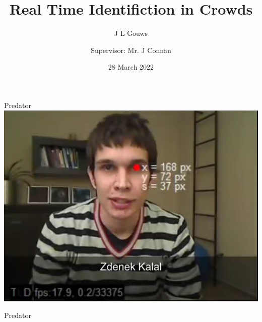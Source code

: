 \documentclass[mathserif]{beamer}
\title{Real Time Identifiction in Crowds}
\subtitle{}
\author[Gouws]{J L Gouws\inst{1}\\[1ex]  \and {\small Supervisor: Mr. J Connan\inst{1}}}
\date{28 March 2022}
\institute[RU]{\inst{1} Rhodes University}
\begin{document}
\begin{frame}
   \maketitle
\end{frame}

\begin{frame}{Predator\cite{PredatorVid}}
\centering
  \includegraphics[width=1.0\textwidth]{predatorcutThumb.png}
\end{frame}
\begin{frame}{Predator \cite{PredatorVid}}
\centering
\end{frame}
\end{document}
